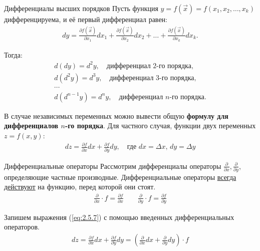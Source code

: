 \begin{tbox}{Дифференциалы высших порядков}
	Пусть функция $y = f(\vec{x}) = f(x_1, x_2, \dots, x_k)$ дифференцируема, и её первый дифференциал равен:
	\begin{align}\label{eq:2.5.6}
		dy = \frac{\partial f(\vec{x})}{\partial x_1} dx_1 + \frac{\partial f(\vec{x})}{\partial x_2} dx_2 + \dots + \frac{\partial f(\vec{x})}{\partial x_k} dx_k.
	\end{align}

	Тогда:
	\begin{gather*}
		d(dy) = d^2 y, \quad \text{дифференциал 2-го порядка,}\\
		d(d^2 y) = d^3 y, \quad \text{дифференциал 3-го порядка,}\\
		\cdots\\
		d(d^{n-1} y) = d^n y, \quad \text{дифференциал $n$-го порядка.}
	\end{gather*}

	В случае независимых переменных можно вывести общую \textbf{формулу для дифференциалов $n$-го порядка}. Для частного случая, функции двух переменных $z = f(x, y)$:
	\begin{align} \label{eq:2.5.7}
		dz = \frac{\partial f}{\partial x} dx + \frac{\partial f}{\partial y} dy, \quad\text{где $dx = \Delta x$, $dy = \Delta y$}
	\end{align}
\end{tbox}

\begin{tbox}{Дифференциальные операторы}
	Рассмотрим дифференциалы операторы $\frac{\partial}{\partial x}, \frac{\partial}{\partial y}$, определяющие частные производные. Дифференциальные операторы \uline{всегда действуют} на функцию, перед которой они стоят.
	\begin{align} \label{eq:2.5.8}
		\frac{\partial}{\partial x} \cdot f = \frac{\partial f}{\partial x} \qquad \frac{\partial}{\partial y} \cdot f = \frac{\partial f}{\partial y}
	\end{align}

	Запишем выражения (\ref{eq:2.5.7}) с помощью введенных дифференциальных операторов.
	\begin{align} \label{3.9}
		dz = \frac{\partial f}{\partial x} dx + \frac{\partial f}{\partial y} dy
		= \left( \frac{\partial}{\partial x} dx + \frac{\partial}{\partial y} dy \right) \cdot f
	\end{align}
\end{tbox}

